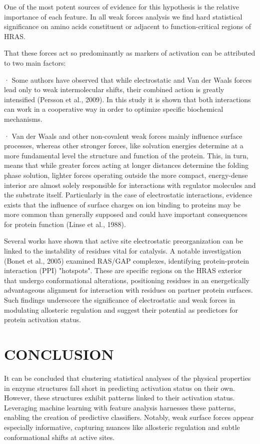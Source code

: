 \documentclass{article}
\begin{document}
One of the most potent sources of evidence for this hypothesis is the relative importance of each feature. In all weak forces analysis we find hard statistical significance on amino acids constituent or adjacent to function-critical regions of HRAS.

That these forces act so predominantly as markers of activation can be attributed to two main factors:

· Some authors have observed that while electrostatic and Van der Waals forces lead only to weak intermolecular shifts, their combined action is greatly intensified (Persson et al., 2009). In this study it is shown that both interactions can work in a cooperative way in order to optimize specific biochemical mechanisms. 

 · Van der Waals and other non-covalent weak forces mainly influence surface processes, whereas other stronger forces, like solvation energies determine at a more fundamental level the structure and function of the protein. This, in turn, means that while greater forces acting at longer distances determine the folding phase solution, lighter forces operating outside the more compact, energy-dense interior are almost solely responsible for interactions with regulator molecules and the substrate itself. Particularly in the case of electrostatic interactions, evidence exists that the influence of surface charges on ion binding to proteins may be more common than generally supposed and could have important consequences for protein function (Linse et al., 1988).

 Several works have shown that active site electrostatic preorganization can be linked to the instability of residues vital for catalysis. A notable investigation (Bonet et al., 2005) examined RAS/GAP complexes, identifying protein-protein interaction (PPI) "hotspots". These are specific regions on the HRAS exterior that undergo conformational alterations, positioning residues in an energetically advantageous alignment for interaction with residues on partner protein surfaces. Such findings underscore the significance of electrostatic and weak forces in modulating allosteric regulation and suggest their potential as predictors for protein activation status.

\section{CONCLUSION}

It can be concluded that clustering statistical analyses of the physical properties in enzyme structures fall short in predicting activation status on their own. However, these structures exhibit patterns linked to their activation status. Leveraging machine learning with feature analysis harnesses these patterns, enabling the creation of predictive classifiers. Notably, weak surface forces appear especially informative, capturing nuances like allosteric regulation and subtle conformational shifts at active sites.
\end{document}
